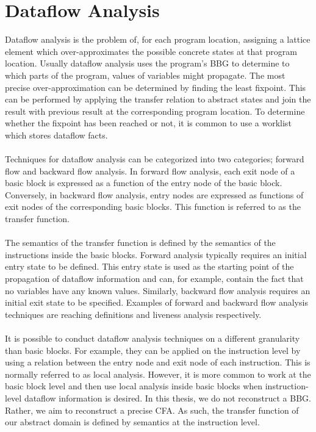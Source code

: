 \documentclass{kththesis}
\newcommand{\fbcomment}[1]{{#1}}
\renewcommand{\fbcomment}[1]{}
\begin{document}
\section{Dataflow Analysis}
\fbcomment{\color{red}Goal: Give the reader an understanding of the context of the CPA algorithm(The core worklist algorithm which which is based on theory from dataflow analysis)}
Dataflow analysis is the problem of, for each program location, assigning a lattice element which over-approximates the possible concrete states at that program location\cite{cpaAlgo}. Usually dataflow analysis uses the program's BBG to determine to which parts of the program, values of variables might propagate. The most precise over-approximation can be determined by finding the least fixpoint. This can be performed by applying the transfer relation to abstract states and join the result with previous result at the corresponding program location. To determine whether the fixpoint has been reached or not, it is common to use a worklist which stores dataflow facts\cite{cpaAlgo}.
\\ \\
Techniques for dataflow analysis can be categorized into two categories; forward flow and backward flow analysis. In forward flow analysis, each exit node of a basic block is expressed as a function of the entry node of the basic block. Conversely, in backward flow analysis, entry nodes are expressed as functions of exit nodes of the corresponding basic blocks. This function is referred to as the transfer function.
\\ \\
The semantics of the transfer function is defined by the semantics of the instructions inside the basic blocks. Forward analysis typically requires an initial entry state to be defined. This entry state is used as the starting point of the propagation of dataflow information and can, for example, contain the fact that no variables have any known values. Similarly, backward flow analysis requires an initial exit state to be specified. Examples of forward and backward flow analysis techniques are reaching definitions and liveness analysis respectively.
\\ \\
It is possible to conduct dataflow analysis techniques on a different granularity than basic blocks. For example, they can be applied on the instruction level by using a relation between the entry node and exit node of each instruction. This is normally referred to as local analysis\cite{carneigeDataFlow}. However, it is more common to work at the basic block level and then use local analysis inside basic blocks when instruction-level dataflow information is desired\cite{carneigeDataFlow}. In this thesis, we do not reconstruct a BBG. Rather, we aim to reconstruct a precise CFA. As such, the transfer function of our abstract domain is defined by semantics at the instruction level. 
\end{document}
